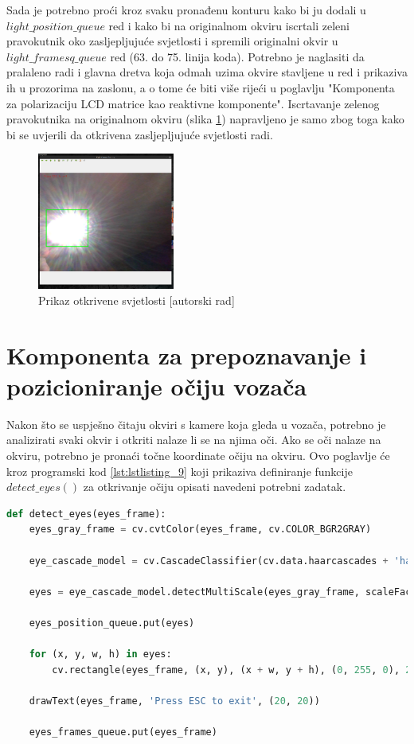 \documentclass{foi}
\begin{document}
Sada je potrebno proći kroz svaku pronađenu konturu kako bi ju dodali u $light\_position\_queue$ red i kako bi na originalnom okviru iscrtali zeleni pravokutnik oko zasljepljujuće svjetlosti i spremili originalni okvir u $light\_framesq\_queue$ red (63. do 75. linija koda). Potrebno je naglasiti da pralaleno radi i glavna dretva koja odmah uzima okvire stavljene u red i prikaziva ih u prozorima na zaslonu, a o tome će biti više rijeći u poglavlju "Komponenta za polarizaciju LCD matrice kao reaktivne komponente". Iscrtavanje zelenog pravokutnika na originalnom okviru (slika \ref{fig:sustav2}) napravljeno je samo zbog toga kako bi se uvjerili da otkrivena zasljepljujuće svjetlosti radi.

\begin{figure}[h!]
    \centering
    \includegraphics[width=0.4\textwidth]{slike/sustav2}
    \caption{Prikaz otkrivene svjetlosti [autorski rad]}
    \label{fig:sustav2}
\end{figure}

\pagebreak
\section{Komponenta za prepoznavanje i pozicioniranje očiju vozača}

Nakon što se uspješno čitaju okviri s kamere koja gleda u vozača, potrebno je analizirati svaki okvir i otkriti nalaze li se na njima oči. Ako se oči nalaze na okviru, potrebno je pronaći točne koordinate očiju na okviru. Ovo poglavlje će kroz programski kod \ref{lst:lstlisting_9} koji prikaziva definiranje funkcije $detect\_eyes()$ za otkrivanje očiju opisati navedeni potrebni zadatak.

\begin{lstlisting}[language=Python, label={lst:lstlisting_9}, firstnumber=33, style=colored, caption={Definicija funkcije $detect\_eyes()$}]
def detect_eyes(eyes_frame):
    eyes_gray_frame = cv.cvtColor(eyes_frame, cv.COLOR_BGR2GRAY)

    eye_cascade_model = cv.CascadeClassifier(cv.data.haarcascades + 'haarcascade_eye.xml')

    eyes = eye_cascade_model.detectMultiScale(eyes_gray_frame, scaleFactor=1.1, minNeighbors=5, minSize=(30, 30))

    eyes_position_queue.put(eyes)

    for (x, y, w, h) in eyes:
        cv.rectangle(eyes_frame, (x, y), (x + w, y + h), (0, 255, 0), 2)

    drawText(eyes_frame, 'Press ESC to exit', (20, 20))

    eyes_frames_queue.put(eyes_frame)
\end{lstlisting}
\end{document}
